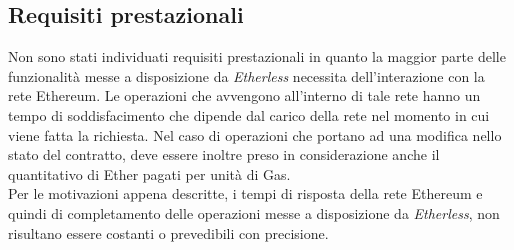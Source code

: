 \subsection{Requisiti prestazionali}
Non sono stati individuati requisiti prestazionali in quanto la maggior parte delle funzionalità messe a disposizione da \textit{Etherless} necessita dell'interazione con la rete Ethereum. Le operazioni che avvengono all'interno di tale rete hanno un tempo di soddisfacimento che dipende dal carico della rete nel momento in cui viene fatta la richiesta. Nel caso di operazioni che portano ad una modifica nello stato del contratto, deve essere inoltre preso in considerazione anche il quantitativo di Ether pagati per unità di Gas. \\ 
Per le motivazioni appena descritte, i tempi di risposta della rete Ethereum e quindi di completamento delle operazioni messe a disposizione da \textit{Etherless}, non risultano essere costanti o prevedibili con precisione. 
